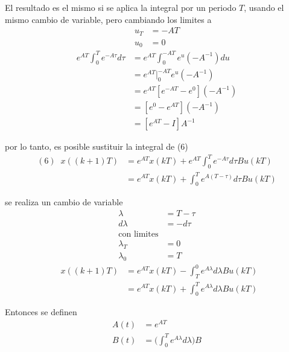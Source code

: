 El resultado es el mismo si se aplica la integral por un periodo \( T \), usando el mismo cambio de variable, pero cambiando los limites a 
\[
    \begin{split}
        u_{T} & = -AT \\
        u_{0} & = 0
    \end{split}
\]
\[
    \begin{split}
        e^{ AT } \int_{0}^{T} e^{ -A\tau } d\tau & = e^{ AT } \int_{0}^{ -AT } e^{ u }(-A^{-1})du \\
        & = e^{ AT } \big|_{0}^{-AT} e^{u}(-A^{-1}) \\
        & = e^{ AT } [ e^{-AT} - e^{0} ] (-A^{-1}) \\
        & = [ e^{0} - e^{AT} ](-A^{-1}) \\
        & = [ e^{ AT } - I ]A^{-1}
    \end{split}
\]

por lo tanto, es posible sustituir la integral de (6)
\[
    \begin{split}
        (6) \;\; x((k+1)T) & = e^{ AT }x(kT) + e^{ AT } \int_{0}^{T} e^{ -A\tau } d\tau Bu(kT) \\
        & = e^{ AT }x(kT) + \int_{0}^{T} e^{ A(T-\tau) } d\tau Bu(kT)
    \end{split}
\]

se realiza un cambio de variable 
\[ 
    \begin{split}
        \lambda & = T - \tau \\
        d\lambda & = -d\tau \\
        \text{con limites} \\
        \lambda_{T} & = 0 \\
        \lambda_{0} & = T
    \end{split} 
\]
\[
    \begin{split}
        \;\; x((k+1)T) & = e^{ AT }x(kT) - \int_{T}^{0} e^{A\lambda} d\lambda Bu(kT) \\
        & = e^{ AT }x(kT) + \int_{0}^{T} e^{ A\lambda } d\lambda Bu(kT)
    \end{split}
\]

Entonces se definen
\[
    \begin{split}
        A(t) & = e^{ AT } \\
        B(t) & = \big( \int_{0}^{T} e^{ A\lambda } d\lambda \big) B
    \end{split}
\]